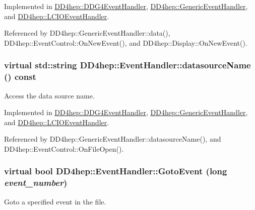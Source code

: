 Implemented in \hyperlink{class_d_d4hep_1_1_d_d_g4_event_handler_a066893cdf431bef4b398b58624aab22c}{DD4hep::DDG4EventHandler}, \hyperlink{class_d_d4hep_1_1_generic_event_handler_aa1e4452bde1823d4592d4c61f6a62fcc}{DD4hep::GenericEventHandler}, and \hyperlink{class_d_d4hep_1_1_l_c_i_o_event_handler_a7118606d31e1a2a3b988af04a6dbcc2d}{DD4hep::LCIOEventHandler}.

Referenced by DD4hep::GenericEventHandler::data(), DD4hep::EventControl::OnNewEvent(), and DD4hep::Display::OnNewEvent().\hypertarget{class_d_d4hep_1_1_event_handler_a5fa231363a787ba7edf520b5a99f294e}{
\subsubsection[{datasourceName}]{\setlength{\rightskip}{0pt plus 5cm}virtual std::string DD4hep::EventHandler::datasourceName () const}}
\label{class_d_d4hep_1_1_event_handler_a5fa231363a787ba7edf520b5a99f294e}


Access the data source name. 

Implemented in \hyperlink{class_d_d4hep_1_1_d_d_g4_event_handler_ab5f21b250f691a4dae9b1a1deca61440}{DD4hep::DDG4EventHandler}, \hyperlink{class_d_d4hep_1_1_generic_event_handler_a9049182126476c4af50c72d15c120471}{DD4hep::GenericEventHandler}, and \hyperlink{class_d_d4hep_1_1_l_c_i_o_event_handler_a5be4ec13eea78675737c710f6505ac33}{DD4hep::LCIOEventHandler}.

Referenced by DD4hep::GenericEventHandler::datasourceName(), and DD4hep::EventControl::OnFileOpen().\hypertarget{class_d_d4hep_1_1_event_handler_a09c40b0b753455c1e3df7c561ff6b069}{
\subsubsection[{GotoEvent}]{\setlength{\rightskip}{0pt plus 5cm}virtual bool DD4hep::EventHandler::GotoEvent (long {\em event\_\-number})}}
\label{class_d_d4hep_1_1_event_handler_a09c40b0b753455c1e3df7c561ff6b069}


Goto a specified event in the file. 


